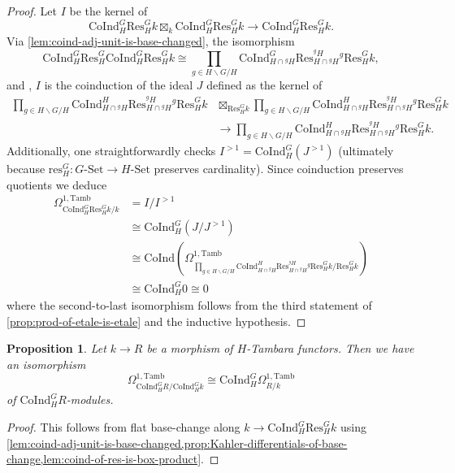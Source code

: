 \documentclass[11pt,dvipsnames]{amsart}
\newtheorem{proposition}[theorem]{Proposition}
\theoremstyle{BoldRemark}
\newcommand{\Res}{\mathrm{Res}}
\newcommand{\res}{\mathrm{res}}
\newcommand{\Coind}{\mathrm{CoInd}}
\newcommand{\Tamb}{\mathrm{Tamb}}
\begin{document}
\begin{proof}
    Let $I$ be the kernel of 
	\[ 
		\Coind_H^G \Res_H^G k \boxtimes_k \Coind_H^G \Res_H^G k \rightarrow \Coind_H^G \Res_H^G k . 
	\]
    Via \cref{lem:coind-adj-unit-is-base-changed}, the isomorphism
    \[ 
        \Coind_H^G \Res_H^G \Coind_H^G \Res_H^G k \cong \prod_{g \in H \backslash G / H} \Coind_{H \cap {}^g H}^G \Res_{H \cap {}^g H}^{{}^g H} {}^g \Res_H^G k , 
    \] 
    and \cite[Theorem A]{Wis25b}, $I$ is the coinduction of the ideal $J$ defined as the kernel of 
    \begin{align*}
        \prod_{g \in H \backslash G / H} \Coind_{H \cap {}^g H}^H \Res_{H \cap {}^g H}^{{}^g H} {}^g \Res_H^G k & \boxtimes_{\Res_H^G k} \prod_{g \in H \backslash G / H} \Coind_{H \cap {}^g H}^H \Res_{H \cap {}^g H}^{{}^g H} {}^g \Res_H^G k \\
        & \rightarrow \prod_{g \in H \backslash G / H} \Coind_{H \cap {}^g H}^H \Res_{H \cap {}^g H}^{{}^g H} {}^g \Res_H^G k .
    \end{align*}
    Additionally, one straightforwardly checks $I^{>1} = \Coind_H^G (J^{>1})$ (ultimately because $\res_H^G : G \text{-} \mathrm{Set} \rightarrow H \text{-} \mathrm{Set}$ preserves cardinality). Since coinduction preserves quotients we deduce 
	\begin{align*} 
		\Omega^{1,\Tamb}_{\Coind_H^G \Res_H^G k/k} & = I/I^{>1} \\
        & \cong \Coind_H^G (J/J^{>1}) \\
        & \cong \Coind \left( \Omega^{1,\Tamb}_{\prod_{g \in H \backslash G / H} \Coind_{H \cap {}^g H}^H \Res_{H \cap {}^g H}^{{}^g H} {}^g \Res_H^G k/\Res_H^G k} \right) \\ 
        & \cong \Coind_H^G 0 \cong 0
	\end{align*}
	where the second-to-last isomorphism follows from the third statement of \cref{prop:prod-of-etale-is-etale} and the inductive hypothesis.
\end{proof}

\begin{proposition}\label{prop:coind-of-Kahler-differentials}
	Let $k \rightarrow R$ be a morphism of $H$-Tambara functors. Then we have an isomorphism
	\[ 
		\Omega^{1,\Tamb}_{\Coind_H^G R / \Coind_H^G k} \cong \Coind_H^G \Omega^{1,\Tamb}_{R/k} 
	\]
	of $\Coind_H^G R$-modules.
\end{proposition}

\begin{proof}
    This follows from flat base-change along $k \rightarrow \Coind_H^G \Res_H^G k$ using \cref{lem:coind-adj-unit-is-base-changed,prop:Kahler-differentials-of-base-change,lem:coind-of-res-is-box-product}.
\end{proof}
\end{document}
